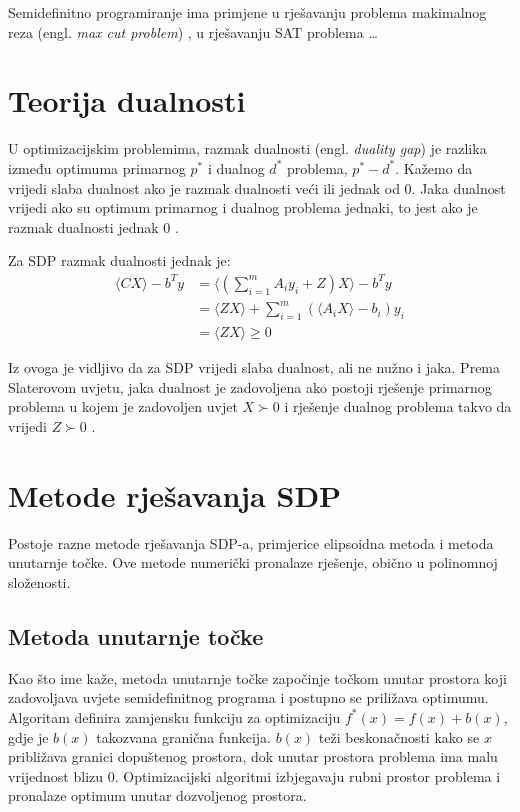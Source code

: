 \documentclass[diplomskirad]{fer}
\begin{document}
Semidefinitno programiranje ima primjene u rješavanju problema makimalnog reza (engl. \textit{max cut problem}) \cite{7804990}, u rješavanju SAT problema \cite{doi:10.3233/SAT190001} \dots %

\section{Teorija dualnosti}
U optimizacijskim problemima, razmak dualnosti (engl. \textit{duality gap}) je razlika između optimuma primarnog $p^*$ i dualnog $d^*$ problema, $p^* - d^*$.
Kažemo da vrijedi slaba dualnost ako je razmak dualnosti veći ili jednak od 0. Jaka dualnost vrijedi ako su optimum primarnog i dualnog problema jednaki, to jest
ako je razmak dualnosti jednak 0 \cite{HINTERMULLER2019437}.

Za SDP razmak dualnosti jednak je:
\begin{equation}
  \begin{split}
    \langle CX \rangle - b^Ty &= \langle(\sum_{i=1}^{m}A_iy_i + Z)X \rangle - b^Ty \\
    &= \langle ZX \rangle + \sum_{i=1}^{m}(\langle A_iX \rangle - b_i) y_i \\
    &= \langle ZX \rangle \geq 0
  \end{split}
\end{equation}

Iz ovoga je vidljivo da za SDP vrijedi slaba dualnost, ali ne nužno i jaka. Prema Slaterovom uvjetu, jaka dualnost je zadovoljena ako postoji rješenje primarnog problema u kojem je
zadovoljen uvjet $X \succ 0$ i rješenje dualnog problema takvo da vrijedi $Z \succ 0$ \cite{slater}.

\section{Metode rješavanja SDP}
Postoje razne metode rješavanja SDP-a, primjerice elipsoidna metoda i metoda unutarnje točke. Ove metode numerički pronalaze rješenje, obično u polinomnoj složenosti.

\subsection{Metoda unutarnje točke}
Kao što ime kaže, metoda unutarnje točke započinje točkom unutar prostora koji zadovoljava uvjete semidefinitnog programa i postupno se priližava optimumu.
Algoritam definira zamjensku funkciju za optimizaciju $f^*(x) = f(x) + b(x)$, gdje je $b(x)$ takozvana granična funkcija. $b(x)$ teži beskonačnosti kako se
$x$ približava granici dopuštenog prostora, dok unutar prostora problema ima malu vrijednost blizu 0. 
Optimizacijski algoritmi izbjegavaju rubni prostor problema i pronalaze optimum unutar dozvoljenog prostora.
\end{document}
